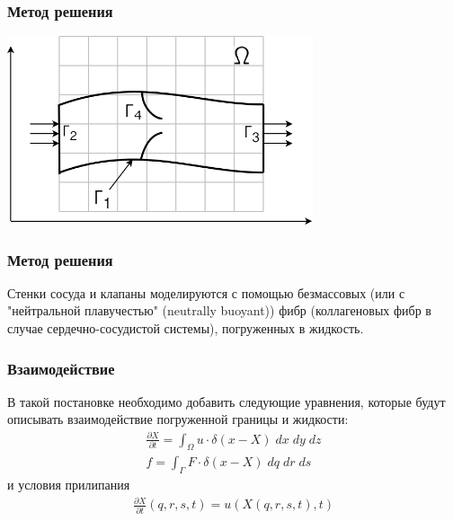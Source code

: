 \documentclass[14pt]{beamer}
\begin{document}
\begin{frame}
\frametitle{Метод решения}
    \begin{center}
        \includegraphics[width=9cm]{area_ibm.png}
    \end{center}
\end{frame}

\begin{frame}
\frametitle{Метод решения}
Стенки сосуда и клапаны моделируются с помощью безмассовых (или с "нейтральной плавучестью" (neutrally buoyant)) фибр (коллагеновых фибр в случае сердечно-сосудистой системы), погруженных в жидкость.
\end{frame}

\begin{frame}
\frametitle{Взаимодействие}
В такой постановке необходимо добавить следующие уравнения, которые будут описывать взаимодействие погруженной границы и жидкости:
\begin{gather}
    \label{eq:ibm_velocity}
    \frac{\partial X}{\partial t} = \int_{\Omega} u \cdot \delta (x - X)\; dx\; dy\; dz \\
    \label{eq:ibm_force}
    f = \int_{\Gamma} F \cdot \delta (x - X)\; dq\; dr\; ds
\end{gather}
и условия прилипания
\begin{gather}
    \label{eq:no_slip}
    \frac{\partial X}{\partial t} (q, r, s, t) = u(X(q, r, s, t), t)
\end{gather}
\end{frame}
\end{document}
